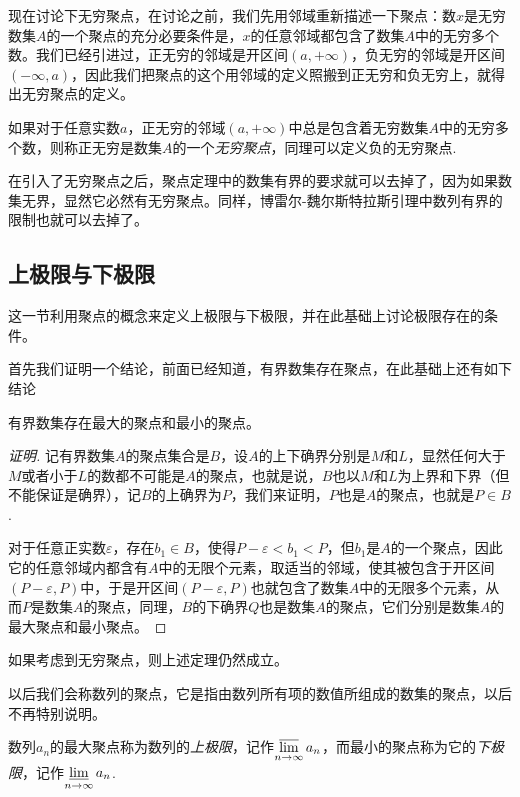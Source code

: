 现在讨论下无穷聚点，在讨论之前，我们先用邻域重新描述一下聚点：数$x$是无穷数集$A$的一个聚点的充分必要条件是，$x$的任意邻域都包含了数集$A$中的无穷多个数。我们已经引进过，正无穷的邻域是开区间$(a,+\infty)$，负无穷的邻域是开区间$(-\infty,a)$，因此我们把聚点的这个用邻域的定义照搬到正无穷和负无穷上，就得出无穷聚点的定义。

\begin{definition}
  如果对于任意实数$a$，正无穷的邻域$(a,+\infty)$中总是包含着无穷数集$A$中的无穷多个数，则称正无穷是数集$A$的一个\emph{无穷聚点}，同理可以定义负的无穷聚点. 
\end{definition}

在引入了无穷聚点之后，聚点定理中的数集有界的要求就可以去掉了，因为如果数集无界，显然它必然有无穷聚点。同样，博雷尔-魏尔斯特拉斯引理中数列有界的限制也就可以去掉了。

\subsection{上极限与下极限}
\label{sec:upper-limit-and-lower-limit}

这一节利用聚点的概念来定义上极限与下极限，并在此基础上讨论极限存在的条件。

首先我们证明一个结论，前面已经知道，有界数集存在聚点，在此基础上还有如下结论
\begin{theorem}
  有界数集存在最大的聚点和最小的聚点。
\end{theorem}

\begin{proof}[证明]
  记有界数集$A$的聚点集合是$B$，设$A$的上下确界分别是$M$和$L$，显然任何大于$M$或者小于$L$的数都不可能是$A$的聚点，也就是说，$B$也以$M$和$L$为上界和下界（但不能保证是确界），记$B$的上确界为$P$，我们来证明，$P$也是$A$的聚点，也就是$P \in B$.

  对于任意正实数$\varepsilon$，存在$b_1 \in B$，使得$P-\varepsilon < b_1 < P$，但$b_1$是$A$的一个聚点，因此它的任意邻域内都含有$A$中的无限个元素，取适当的邻域，使其被包含于开区间$(P-\varepsilon,P)$中，于是开区间$(P-\varepsilon,P)$也就包含了数集$A$中的无限多个元素，从而$P$是数集$A$的聚点，同理，$B$的下确界$Q$也是数集$A$的聚点，它们分别是数集$A$的最大聚点和最小聚点。
\end{proof}

如果考虑到无穷聚点，则上述定理仍然成立。

以后我们会称数列的聚点，它是指由数列所有项的数值所组成的数集的聚点，以后不再特别说明。

\begin{definition}
  数列$a_n$的最大聚点称为数列的\emph{上极限}，记作$\varlimsup\limits_{n \to \infty}a_n$，而最小的聚点称为它的\emph{下极限}，记作$\varliminf\limits_{n \to \infty} a_n$.
\end{definition}

